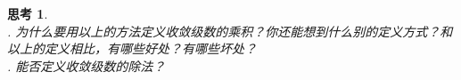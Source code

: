 \documentclass[12pt,UTF8]{ctexbook}
\theoremstyle{definition}
\theoremstyle{plain}
\newtheorem{sk}{思考}[section]
\begin{document}



\begin{sk}
    \mbox{} \\
    . 为什么要用以上的方法定义收敛级数的乘积？你还能想到什么别的定义方式？和以上的定义相比，有哪些好处？有哪些坏处？\\
    . 能否定义收敛级数的除法？
\end{sk}
\end{document}
